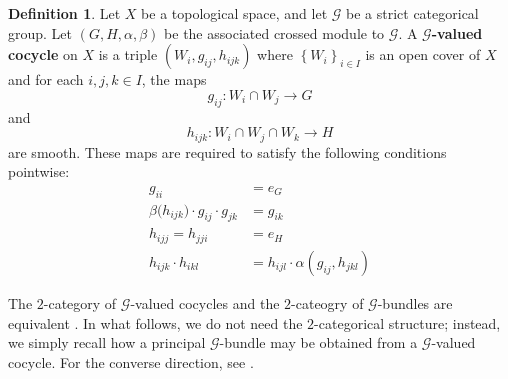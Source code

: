 \documentclass{article}
\theoremstyle{plain}
\theoremstyle{definition}
\newtheorem{defn}[thm]{Definition}
\begin{document}
\begin{defn}\cite{MR2342821}\cite[Definition 2.12 on page 578]{MR2805195}\label{gvaluedcocycle} Let $X$ be a topological space, and let $\mathcal{G}$ be a strict categorical group. Let $(G,H,\alpha,\beta)$ be the associated crossed module to $\mathcal{G}$. A \textbf{$\mathcal{G}$-valued cocycle} on $X$ is a triple $(W_i,g_{ij},h_{ijk})$ where $\left\{W_i\right\}_{i \in I}$ is an open cover of $X$ and for each $i,j,k \in I$, the maps $$g_{ij}:W_i \cap W_j \longrightarrow G$$ and $$h_{ijk}:W_i \cap W_j \cap W_k \longrightarrow H$$ are smooth. These maps are required to satisfy the following conditions pointwise:
\begin{align}
g_{ii} & = e_G \label{gii} \\
\beta\bigl(h_{ijk}\bigr) \cdot g_{ij} \cdot g_{jk} & = g_{ik} \label{cocycleg} \\
h_{ijj} = h_{jji} & = e_H \label{hijj} \\
h_{ijk} \cdot h_{ikl} & = h_{ijl} \cdot \alpha(g_{ij},h_{jkl}) \label{cocycleh}
\end{align}
\end{defn}
The $2$-category of $\mathcal{G}$-valued cocycles and the $2$-cateogry of $\mathcal{G}$-bundles are equivalent \cite[Sections 2.5.2 and 2.5.3]{MR2709030}. In what follows, we do not need the $2$-categorical structure; instead, we simply recall how a principal $\mathcal{G}$-bundle may be obtained from a $\mathcal{G}$-valued cocycle. For the converse direction, see \cite[Remark 2.14 on page 580]{MR2805195}.
\end{document}
